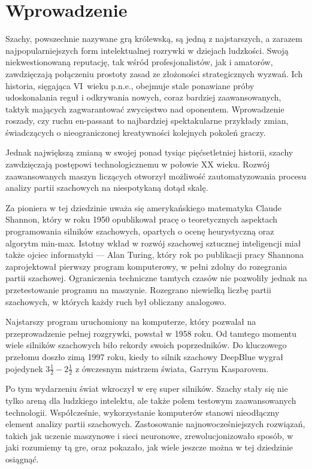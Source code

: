 \section{Wprowadzenie}
\label{sec:wprowadzenie}

Szachy, powszechnie nazywane grą królewską, są jedną z najstarszych, a zarazem najpopularniejszych form intelektualnej rozrywki w dziejach ludzkości.
Swoją niekwestionowaną reputację, tak wśród profesjonalistów, jak i amatorów, zawdzięczają połączeniu prostoty zasad ze złożoności strategicznych wyzwań.
Ich historia, sięgająca VI~wieku p.n.e., obejmuje stale ponawiane próby udoskonalania reguł i odkrywania nowych, coraz bardziej zaawansowanych, taktyk mających zagwarantować zwycięstwo nad oponentem.
Wprowadzenie roszady, czy ruchu en-passant to najbardziej spektakularne przykłady zmian, świadczących o nieograniczonej kreatywności kolejnych pokoleń graczy.


Jednak największą zmianą w swojej ponad tysiąc pięćsetletniej historii, szachy zawdzięczają postępowi technologicznemu w połowie XX wieku.
Rozwój zaawansowanych maszyn liczących otworzył możliwość zautomatyzowania procesu analizy partii szachowych na niespotykaną dotąd skalę.


Za pioniera w tej dziedzinie uważa się amerykańskiego matematyka Claude Shannon, który w roku 1950 opublikował pracę o teoretycznych aspektach programowania silników szachowych, opartych o ocenę heurystyczną oraz algorytm min-max.
Istotny wkład w rozwój szachowej sztucznej inteligencji miał także ojciec informatyki — Alan Turing, który rok po publikacji pracy Shannona zaprojektował pierwszy program komputerowy, w pełni zdolny do rozegrania partii szachowej.
Ograniczenia techniczne tamtych czasów nie pozwoliły jednak na przetestowanie programu na maszynie.
Rozegrano niewielką liczbę partii szachowych, w których każdy ruch był obliczany analogowo.


Najstarszy program uruchomiony na komputerze, który pozwalał na przeprowadzenie pełnej rozgrywki, powstał w 1958 roku.
Od tamtego momentu wiele silników szachowych biło rekordy swoich poprzedników.
Do kluczowego przełomu doszło zimą 1997 roku, kiedy to silnik szachowy DeepBlue wygrał pojedynek $3\frac{1}{2} - 2\frac{1}{2}$ z ówczesnym mistrzem świata, Garrym Kasparovem.


Po tym wydarzeniu świat wkroczył w erę super silników.
Szachy stały się nie tylko areną dla ludzkiego intelektu, ale także polem testowym zaawansowanych technologii.
Współcześnie, wykorzystanie komputerów stanowi nieodłączny element analizy partii szachowych.
Zastosowanie najnowocześniejszych rozwiązań, takich jak uczenie maszynowe i sieci neuronowe, zrewolucjonizowało sposób, w jaki rozumiemy tą gre, oraz pokazało, jak wiele jeszcze można w tej dziedzinie osiągnąć.

